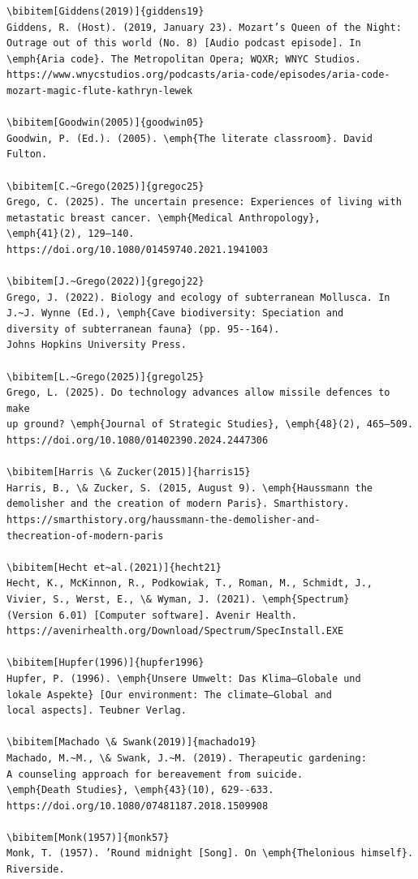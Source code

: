 \documentclass[]{interact}
\theoremstyle{plain}%
\theoremstyle{definition}
\theoremstyle{remark}
\begin{document}
\begin{verbatim}
\bibitem[Giddens(2019)]{giddens19}
Giddens, R. (Host). (2019, January 23). Mozart’s Queen of the Night:
Outrage out of this world (No. 8) [Audio podcast episode]. In
\emph{Aria code}. The Metropolitan Opera; WQXR; WNYC Studios.
https://www.wnycstudios.org/podcasts/aria-code/episodes/aria-code-
mozart-magic-flute-kathryn-lewek

\bibitem[Goodwin(2005)]{goodwin05}
Goodwin, P. (Ed.). (2005). \emph{The literate classroom}. David Fulton.

\bibitem[C.~Grego(2025)]{gregoc25}
Grego, C. (2025). The uncertain presence: Experiences of living with
metastatic breast cancer. \emph{Medical Anthropology},
\emph{41}(2), 129–140.
https://doi.org/10.1080/01459740.2021.1941003

\bibitem[J.~Grego(2022)]{gregoj22}
Grego, J. (2022). Biology and ecology of subterranean Mollusca. In
J.~J. Wynne (Ed.), \emph{Cave biodiversity: Speciation and
diversity of subterranean fauna} (pp. 95--164).
Johns Hopkins University Press.

\bibitem[L.~Grego(2025)]{gregol25}
Grego, L. (2025). Do technology advances allow missile defences to make
up ground? \emph{Journal of Strategic Studies}, \emph{48}(2), 465–509.
https://doi.org/10.1080/01402390.2024.2447306

\bibitem[Harris \& Zucker(2015)]{harris15}
Harris, B., \& Zucker, S. (2015, August 9). \emph{Haussmann the
demolisher and the creation of modern Paris}. Smarthistory.
https://smarthistory.org/haussmann-the-demolisher-and-
thecreation-of-modern-paris

\bibitem[Hecht et~al.(2021)]{hecht21}
Hecht, K., McKinnon, R., Podkowiak, T., Roman, M., Schmidt, J., 
Vivier, S., Werst, E., \& Wyman, J. (2021). \emph{Spectrum}
(Version 6.01) [Computer software]. Avenir Health.
https://avenirhealth.org/Download/Spectrum/SpecInstall.EXE

\bibitem[Hupfer(1996)]{hupfer1996}
Hupfer, P. (1996). \emph{Unsere Umwelt: Das Klima—Globale und
lokale Aspekte} [Our environment: The climate—Global and
local aspects]. Teubner Verlag.

\bibitem[Machado \& Swank(2019)]{machado19}
Machado, M.~M., \& Swank, J.~M. (2019). Therapeutic gardening:
A counseling approach for bereavement from suicide.
\emph{Death Studies}, \emph{43}(10), 629--633.
https://doi.org/10.1080/07481187.2018.1509908

\bibitem[Monk(1957)]{monk57}
Monk, T. (1957). ’Round midnight [Song]. On \emph{Thelonious himself}.
Riverside.


\end{verbatim}
\end{document}
